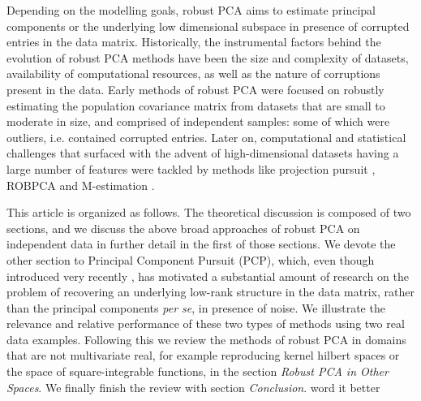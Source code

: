 Depending on the modelling goals, robust PCA aims to estimate principal components or the underlying low dimensional subspace in presence of corrupted entries in the data matrix. Historically, the instrumental factors behind the evolution of robust PCA methods have been the size and complexity of datasets, availability of computational resources, as well as the nature of corruptions present in the data. Early methods of robust PCA were focused on robustly estimating the population covariance matrix from datasets that are small to moderate in size, and comprised of independent samples: some of which were outliers, i.e. contained corrupted entries. Later on, computational and statistical challenges that surfaced with the advent of high-dimensional datasets having a large number of features were tackled by methods like projection pursuit \citep{LiChen85}, ROBPCA \citep{hubert05} and M-estimation \citep{LocantoreEtal99,Majumdar15}.

This article is organized as follows. The theoretical discussion is composed of two sections, and we discuss the above broad approaches of robust PCA on independent data in further detail in the first of those sections. We devote the other section to Principal Component Pursuit (PCP), which, even though introduced very recently \citep{CandesEtal09}, has motivated a substantial amount of research on the problem of recovering an underlying low-rank structure in the data matrix, rather than the principal components \textit{per se}, in presence of noise. We illustrate the relevance and relative performance of these two types of methods using two real data examples. Following this we review the methods of robust PCA in domains that are not multivariate real, for example reproducing kernel hilbert spaces or the space of square-integrable functions, in the section {\it Robust PCA in Other Spaces}. We finally finish the review with section {\it Conclusion}. {\colrbf word it better}
